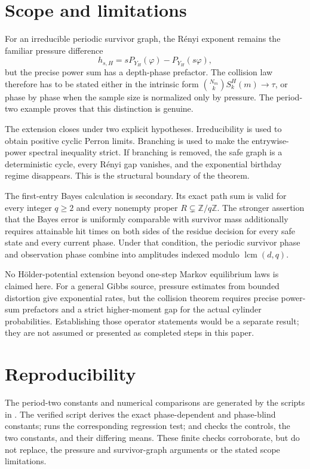 \section{Scope and limitations}\label{sec:conclusion}

For an irreducible periodic survivor graph, the R\'enyi exponent remains
the familiar pressure difference
\[
  h_{s,H}=sP_{Y_H}(\varphi)-P_{Y_H}(s\varphi),
\]
but the precise power sum has a depth-phase prefactor.  The collision
law therefore has to be stated either in the intrinsic form
\(\binom{N_m}{k}S_k^H(m)\to\tau\), or phase by phase when the sample
size is normalized only by pressure.  The period-two example proves
that this distinction is genuine.

The extension closes under two explicit hypotheses.  Irreducibility is
used to obtain positive cyclic Perron limits.  Branching is used to make
the entrywise-power spectral inequality strict.  If branching is
removed, the safe graph is a deterministic cycle, every R\'enyi gap
vanishes, and the exponential birthday regime disappears.  This is the
structural boundary of the theorem.

The first-entry Bayes calculation is secondary.  Its exact path sum is
valid for every integer \(q\geq2\) and every nonempty proper
\(R\subsetneq\mathbb Z/q\mathbb Z\).  The stronger assertion that the
Bayes error is uniformly comparable with survivor mass additionally
requires attainable hit times on both sides of the residue decision for
every safe state and every current phase.  Under that condition, the
periodic survivor phase and observation phase combine into amplitudes
indexed modulo \(\operatorname{lcm}(d,q)\).

No H\"older-potential extension beyond one-step Markov equilibrium laws
is claimed here.  For a general Gibbs source, pressure estimates from
bounded distortion give exponential rates, but the collision theorem
requires precise power-sum prefactors and a strict higher-moment gap for
the actual cylinder probabilities.  Establishing those operator
statements would be a separate result; they are not assumed or presented
as completed steps in this paper.

\section*{Reproducibility}
The period-two constants and numerical comparisons are generated by the
scripts in .  The verified script
 derives the exact
phase-dependent and phase-blind constants; 
runs the corresponding regression test; and
 checks the controls, the two
constants, and their differing means.  These finite checks corroborate, but
do not replace, the pressure and survivor-graph arguments or the stated
scope limitations.
